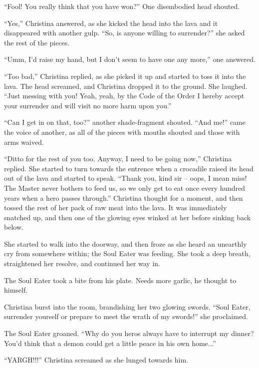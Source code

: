 \documentclass[showtrims,b6paper,draft,10pt]{memoir}
\begin{document}
``Fool!  You really think that you have won?''  One disembodied head shouted.

``Yes,''  Christina answered, as she kicked the head into the lava and it disappeared with another gulp.  ``So, is anyone willing to surrender?''  she asked the rest of the pieces.

``Umm, I'd raise my hand, but I don't seem to have one any more,'' one answered.

``Too bad,'' Christina replied, as she picked it up and started to toss it into the lava.  The head screamed, and Christina dropped it to the ground.  She laughed.  ``Just messing with you!  Yeah, yeah, by the Code of the Order I hereby accept your surrender and will visit no more harm upon you.''

``Can I get in on that, too?''  another shade-fragment shouted.  ``And me!'' came the voice of another, as all of the pieces with mouths shouted and those with arms waived.

``Ditto for the rest of you too.  Anyway, I need to be going now,'' Christina replied.  She started to turn towards the entrence when a crocadile raised its head out of the lava and started to speak.  ``Thank you, kind sir -- oops, I mean miss!  The Master never bothers to feed us, so we only get to eat once every hundred years when a hero passes through.''  Christina thought for a moment, and then tossed the rest of her pack of raw meat into the lava.  It was immediately snatched up, and then one of the glowing eyes winked at her before sinking back below.

She started to walk into the doorway, and then froze as she heard an unearthly cry from somewhere within;  the Soul Eater was feeding.  She took a deep breath, straightened her resolve, and continued her way in.

\timeskip
The Soul Eater took a bite from his plate.  Needs more garlic, he thought to himself.

Christina burst into the room, brandishing her two glowing swords.  ``Soul Eater, surrender yourself or prepare to meet the wrath of my swords!''  she proclaimed.

The Soul Eater groaned.  ``Why do you heros always have to interrupt my dinner?  You'd think that a demon could get a little peace in his own home...''

``YARGH!!!''  Christina screamed as she lunged towards him.
\end{document}

